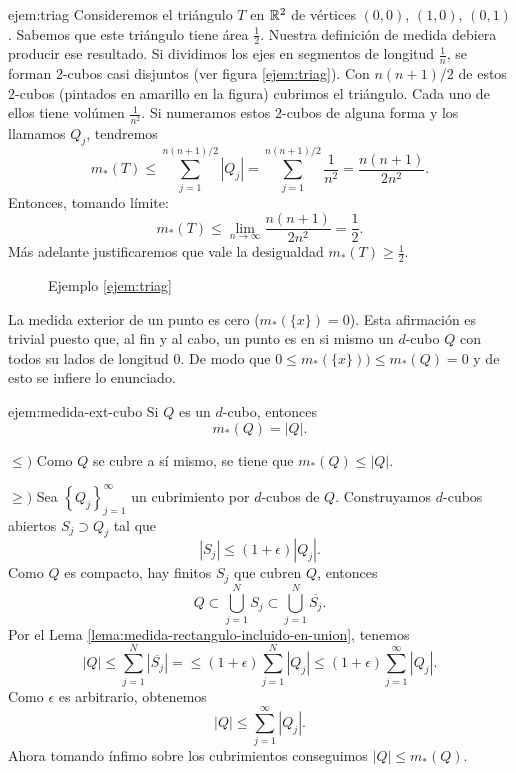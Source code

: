   \begin{ejemplo}{ejem:triag} Consideremos el triángulo $T$ en $\mathbb{R}^2$ de vértices $(0,0)$, $(1,0)$, $(0,1)$. Sabemos que este triángulo tiene área $\frac12$. Nuestra definición de medida debiera producir ese resultado. Si dividimos los ejes en segmentos de longitud $\frac{1}{n}$, se forman $2$-cubos casi disjuntos (ver figura \ref{ejem:triag}). Con $n(n+1)/2$ de estos $2$-cubos (pintados en amarillo en la figura) cubrimos el triángulo. Cada uno de ellos tiene volúmen $\frac{1}{n^2}$. Si numeramos estos $2$-cubos de alguna forma y los llamamos $Q_j$, tendremos
  \[
   m_*(T)\leq \sum_{j=1}^{n(n+1)/2}|Q_j|=\sum_{j=1}^{n(n+1)/2}\frac{1}{n^2}=\frac{n(n+1)}{2n^2}.
  \]
  Entonces, tomando límite:
  \[
   m_*(T)\leq \lim_{n\to\infty}\frac{n(n+1)}{2n^2}=\frac12.   
  \]
  Más adelante justificaremos que vale la desigualdad $m_*(T)\geq\frac12$.

\end{ejemplo}


%
\begin{figure}[h]
 \begin{center}
 \def\svgwidth{8cm}

  \end{center}
  \caption{Ejemplo  \ref{ejem:triag}}\label{fig:descomp}
 \end{figure}


  \begin{ejemplo}{}
  La medida exterior de un punto es cero ($m_*(\{x\})=0$). Esta afirmación es trivial puesto que, al fin y al cabo, un punto es en si mismo un $d$-cubo $Q$ con todos su lados de longitud $0$. De modo que  $0\leq  m_*(\{x\}))\leq m_*(Q)=0$ y de esto se infiere lo enunciado.
  \end{ejemplo}
  
  \begin{ejemplo}{ejem:medida-ext-cubo}
  Si $Q$ es un $d$-cubo, entonces \[m_{*}(Q)=|Q|.\] 
  
  \noindent $\leq)$   Como $Q$ se cubre a s\'i mismo, se tiene que $m_{*}(Q)\leq |Q|$.
  
  \noindent  $\geq)$ 
  Sea $\left\{Q_j\right\}_{j=1}^{\infty}$ un cubrimiento por $d$-cubos de $Q$. Construyamos $d$-cubos abiertos $S_j \supset Q_j$ tal que 
  \[
  |S_j|\leq (1+\epsilon) |Q_j|.
  \]
  Como $Q$ es compacto, hay finitos $S_j$ que cubren $Q$, entonces
  \[
  Q\subset \bigcup\limits_{j=1}^N S_j \subset 
  \bigcup\limits_{j=1}^N \overline{S_j}.
  \]
  Por el Lema \ref{lema:medida-rectangulo-incluido-en-union}, tenemos
  \[
  |Q|\leq 
  \sum\limits_{j=1}^N |\overline{S_j}|=
     \leq (1+\epsilon) \sum\limits_{j=1}^N |Q_j|\leq   (1+\epsilon) \sum\limits_{j=1}^{\infty} |Q_j|.
  \]
  Como $\epsilon$ es arbitrario, obtenemos
  \[
  |Q|\leq \sum\limits_{j=1}^{\infty} |Q_j|.
  \]
  Ahora tomando ínfimo sobre los cubrimientos conseguimos $|Q|\leq m_*(Q)$.
  \end{ejemplo}


